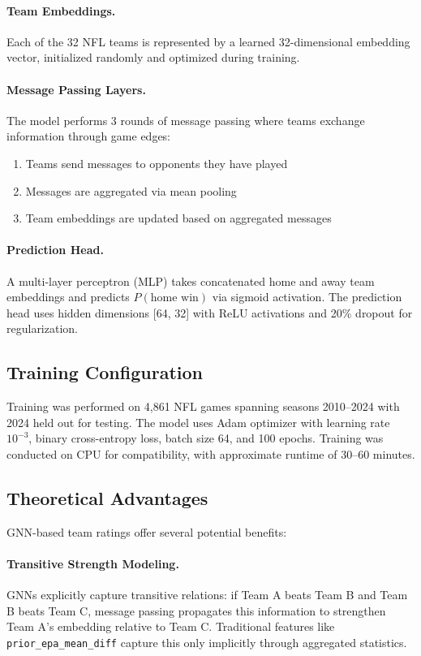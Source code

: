 \documentclass[12pt]{report}  %
\numberwithin{equation}{section}
\theoremstyle{plain}
\theoremstyle{definition}
\theoremstyle{remark}
\begin{document}
\paragraph{Team Embeddings.}
Each of the 32 NFL teams is represented by a learned 32-dimensional embedding vector, initialized randomly and optimized during training.

\paragraph{Message Passing Layers.}
The model performs 3 rounds of message passing where teams exchange information through game edges:
\begin{enumerate}
  \item Teams send messages to opponents they have played
  \item Messages are aggregated via mean pooling
  \item Team embeddings are updated based on aggregated messages
\end{enumerate}

\paragraph{Prediction Head.}
A multi-layer perceptron (MLP) takes concatenated home and away team embeddings and predicts $P(\text{home win})$ via sigmoid activation. The prediction head uses hidden dimensions [64, 32] with ReLU activations and 20\% dropout for regularization.

\subsection{Training Configuration}
Training was performed on 4,861 NFL games spanning seasons 2010--2024 with 2024 held out for testing. The model uses Adam optimizer with learning rate $10^{-3}$, binary cross-entropy loss, batch size 64, and 100 epochs. Training was conducted on CPU for compatibility, with approximate runtime of 30--60 minutes.

\subsection{Theoretical Advantages}
GNN-based team ratings offer several potential benefits:

\paragraph{Transitive Strength Modeling.}
GNNs explicitly capture transitive relations: if Team A beats Team B and Team B beats Team C, message passing propagates this information to strengthen Team A's embedding relative to Team C. Traditional features like \texttt{prior\_epa\_mean\_diff} capture this only implicitly through aggregated statistics.
\end{document}
